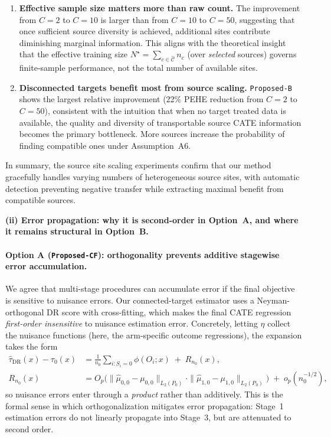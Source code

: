 {\begin{enumerate}[leftmargin=*]
\item \textbf{Effective sample size matters more than raw count.} The improvement from $C=2$ to $C=10$ is larger than from $C=10$ to $C=50$, suggesting that once sufficient source diversity is achieved, additional sites contribute diminishing marginal information. This aligns with the theoretical insight that the effective training size $N^\star = \sum_{c \in \widehat{\mathcal{C}}} n_c$ (over \emph{selected} sources) governs finite-sample performance, not the total number of available sites.

\item \textbf{Disconnected targets benefit most from source scaling.} \texttt{Proposed-B} shows the largest relative improvement (22\% PEHE reduction from $C=2$ to $C=50$), consistent with the intuition that when no target treated data is available, the quality and diversity of transportable source CATE information becomes the primary bottleneck. More sources increase the probability of finding compatible ones under Assumption~A6.
\end{enumerate}

\noindent
In summary, the source site scaling experiments confirm that our method gracefully handles varying numbers of heterogeneous source sites, with automatic detection preventing negative transfer while extracting maximal benefit from compatible sources.

\medskip
\noindent\textbf{(ii) Error propagation: why it is second-order in Option~A, and where it remains structural in Option~B.}

\paragraph{Option A (\texttt{Proposed-CF}): orthogonality prevents additive stagewise error accumulation.}
We agree that multi-stage procedures can accumulate error if the final objective is sensitive to nuisance errors.
Our connected-target estimator uses a Neyman-orthogonal DR score with cross-fitting, which makes the final CATE regression \emph{first-order insensitive} to nuisance estimation error. Concretely, letting $\eta$ collect the nuisance functions (here, the arm-specific outcome regressions), the expansion takes the form
\begin{align*}
\widehat\tau_{\mathrm{DR}}(x)-\tau_0(x)
&=
\frac{1}{n_0}\sum_{i:S_i=0}\phi(O_i;x)
\;+\;
R_{n_0}(x),\\
R_{n_0}(x)
&=
O_p\!\Big(
\|\widehat\mu_{0,0}-\mu_{0,0}\|_{L_2(P_0)}
\cdot
\|\widehat\mu_{1,0}-\mu_{1,0}\|_{L_2(P_0)}
\Big)
\;+\;o_p(n_0^{-1/2}),
\end{align*}
so nuisance errors enter through a \emph{product} rather than additively. This is the formal sense in which orthogonalization mitigates error propagation: Stage~1 estimation errors do not linearly propagate into Stage~3, but are attenuated to second order.

}
